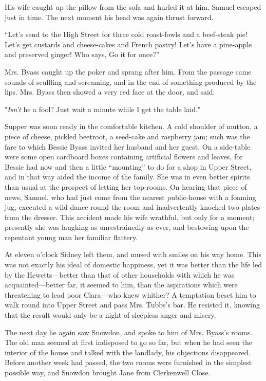His wife caught up the pillow from the sofa and hurled it at him. Samuel
escaped just in time. The next moment his head was again thrust forward.

``Let's send to the High Street for three cold roast-fowls and a
beef-steak pie! Let's get custards and cheese-cakes and French pastry!
Let's have a pine-apple and preserved ginger! Who says, Go it for
once?''

Mrs. Byass caught up the poker and sprang
{\protect\hypertarget{163}{}{}}after him. From the passage came sounds
of scuffling and screaming, and in the end of something produced by the
lips. Mrs. Byass then showed a very red face at the door, and said:

"\emph{Isn't} he a fool? Just wait a minute while I get the table laid."

Supper was soon ready in the comfortable kitchen. A cold shoulder of
mutton, a piece of cheese, pickled beetroot, a seed-cake and raspberry
jam; such was the fare to which Bessie Byass invited her husband and her
guest. On a side-table were some open cardboard boxes containing
artificial flowers and leaves, for Bessie had now and then a little
``mounting'' to do for a shop in Upper Street, and in that way aided the
income of the family. She was in even better spirits than usual at the
prospect of letting her top-rooms. On hearing that piece of news,
Samuel, who had just come from the nearest public-house with a foaming
jug, executed a wild dance round the room and inadvertently knocked two
plates from the dresser. This accident made
{\protect\hypertarget{164}{}{}}his wife wrathful, but only for a moment;
presently she was laughing as unrestrainedly as ever, and bestowing upon
the repentant young man her familiar flattery.

At eleven o'clock Sidney left them, and mused with smiles on his way
home. This was not exactly his ideal of domestic happiness, yet it was
better than the life led by the Hewetts---better than that of other
households with which he was acquainted---better far, it seemed to him,
than the aspirations which were threatening to lead poor Clara---who
knew whither? A temptation beset him to walk round into Upper Street and
pass Mrs. Tubbs's bar. He resisted it, knowing that the result would
only be a night of sleepless anger and misery.

The next day he again saw Snowdon, and spoke to him of Mrs. Byass's
rooms. The old man seemed at first indisposed to go so far, but when he
had seen the interior of the house and talked with the landlady, his
objections disappeared. Before another week had passed, the two rooms
were furnished {\protect\hypertarget{165}{}{}}in the simplest possible
way, and Snowdon brought Jane from Clerkenwell Close.

